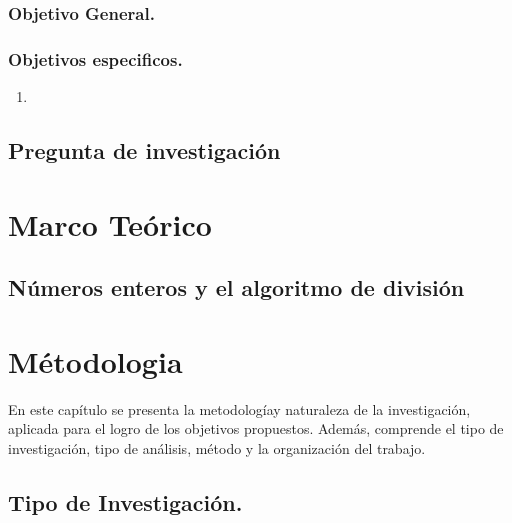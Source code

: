 \documentclass[12pt]{book}
\begin{document}
\subsection{ Objetivo General.}



\subsection{ Objetivos especificos.}

\begin{enumerate}
\item [$\bullet$] 
	\end{enumerate}
	
	\newpage
	
	\section{Pregunta de investigación}
		
\chapter{Marco Teórico}


\section{Números enteros y el algoritmo de división}















\chapter{Métodologia}

En este capítulo se presenta la metodologíay naturaleza de la investigación, aplicada para el logro de los objetivos propuestos. Además, comprende el tipo de investigación, tipo de análisis, método y la organización del trabajo.

\section{Tipo de Investigación.}
\end{document}
